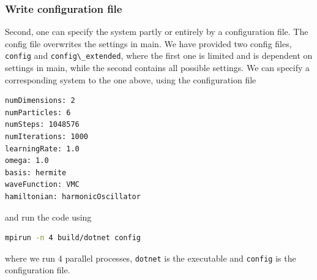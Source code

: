 \subsubsection{Write configuration file}
Second, one can specify the system partly or entirely by a configuration file. The config file overwrites the settings in main. We have provided two config files, \lstinline{config} and \lstinline{config\_extended}, where the first one is limited and is dependent on settings in main, while the second contains all possible settings. We can specify a corresponding system to the one above, using the configuration file
\lstset{basicstyle=\scriptsize}
\begin{lstlisting}[language={bash}]
numDimensions: 2
numParticles: 6
numSteps: 1048576
numIterations: 1000
learningRate: 1.0
omega: 1.0
basis: hermite
waveFunction: VMC
hamiltonian: harmonicOscillator
\end{lstlisting}
and run the code using
\begin{lstlisting}[language={bash}]
mpirun -n 4 build/dotnet config
\end{lstlisting}
where we run 4 parallel processes, \lstinline{dotnet} is the executable and \lstinline{config} is the configuration file. 
